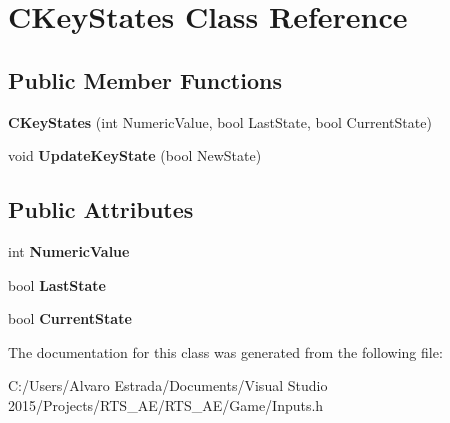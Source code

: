 \hypertarget{class_c_key_states}{}\section{C\+Key\+States Class Reference}
\label{class_c_key_states}
\subsection*{Public Member Functions}
\begin{DoxyCompactItemize}
\item 
{\bfseries C\+Key\+States} (int Numeric\+Value, bool Last\+State, bool Current\+State)\hypertarget{class_c_key_states_a3bed5f5166251c58bd10e8f19c3707fa}{}\label{class_c_key_states_a3bed5f5166251c58bd10e8f19c3707fa}

\item 
void {\bfseries Update\+Key\+State} (bool New\+State)\hypertarget{class_c_key_states_a5e03f3aa93dc674d54e1442a75c9b105}{}\label{class_c_key_states_a5e03f3aa93dc674d54e1442a75c9b105}

\end{DoxyCompactItemize}
\subsection*{Public Attributes}
\begin{DoxyCompactItemize}
\item 
int {\bfseries Numeric\+Value}\hypertarget{class_c_key_states_a4b1b8bbd114084788b8b78ac41001941}{}\label{class_c_key_states_a4b1b8bbd114084788b8b78ac41001941}

\item 
bool {\bfseries Last\+State}\hypertarget{class_c_key_states_ad00114e1ca000007c77b5660a3ea4ea2}{}\label{class_c_key_states_ad00114e1ca000007c77b5660a3ea4ea2}

\item 
bool {\bfseries Current\+State}\hypertarget{class_c_key_states_a14bd688d5583887f675983588fcb1b02}{}\label{class_c_key_states_a14bd688d5583887f675983588fcb1b02}

\end{DoxyCompactItemize}


The documentation for this class was generated from the following file\+:\begin{DoxyCompactItemize}
\item 
C\+:/\+Users/\+Alvaro Estrada/\+Documents/\+Visual Studio 2015/\+Projects/\+R\+T\+S\+\_\+\+A\+E/\+R\+T\+S\+\_\+\+A\+E/\+Game/Inputs.\+h\end{DoxyCompactItemize}
